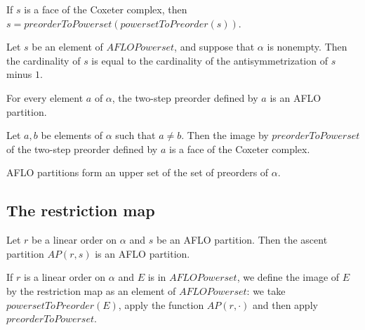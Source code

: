 \begin{sublemma}
If $s$ is a face of the Coxeter complex, then $s=preorderToPowerset(powersetToPreorder(s))$.

\end{sublemma}

\begin{sublemma}
Let $s$ be an element of $AFLOPowerset$, and suppose that $\alpha$ is nonempty. Then the cardinality of $s$ is equal to the
cardinality of the antisymmetrization of $s$ minus $1$.

\end{sublemma}

\begin{sublemma}
For every element $a$ of $\alpha$, the two-step preorder defined by $a$ is an AFLO partition.

\end{sublemma}

\begin{sublemma}
Let $a,b$ be elements of $\alpha$ such that $a\ne b$. Then the image by $preorderToPowerset$ of the two-step preorder defined by $a$
is a face of the Coxeter complex.

\end{sublemma}

\begin{sublemma}
AFLO partitions form an upper set of the set of preorders of $\alpha$.

\end{sublemma}


\subsection{The restriction map}

\begin{sublemma}
Let $r$ be a linear order on $\alpha$ and $s$ be an AFLO partition. Then the ascent partition $AP(r,s)$ is an AFLO partition.

\end{sublemma}

\begin{subdefi}[restriction]
If $r$ is a linear order on $\alpha$ and $E$ is in $AFLOPowerset$, we define the image of $E$ by the restriction map as an element
of $AFLOPowerset$: we take $powersetToPreorder(E)$, apply the function $AP(r,\cdot)$ and then apply $preorderToPowerset$.

\end{subdefi}

